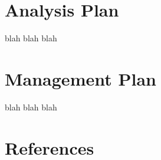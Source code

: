 \documentclass[12pt]{article}
\begin{document}
\newpage
\section*{Analysis Plan}
blah blah blah


\newpage
\section*{Management Plan}
blah blah blah


\newpage
\section*{References}


\end{document}
